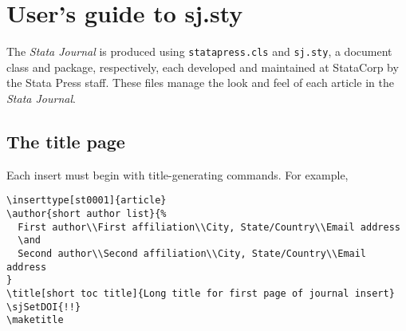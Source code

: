 
\section{User's guide to sj.sty}

The {\sl Stata Journal\/} is produced using \texttt{statapress.cls} and
\texttt{sj.sty}, a {\LaTeXe} document class and package, respectively, each
developed and maintained at StataCorp by the Stata Press staff.  These files
manage the look and feel of each article in the {\sl Stata Journal}.

\subsection{The title page}

Each insert must begin with title-generating commands.  For example,

\begin{stverbatim}
\begin{verbatim}
\inserttype[st0001]{article}
\author{short author list}{%
  First author\\First affiliation\\City, State/Country\\Email address
  \and
  Second author\\Second affiliation\\City, State/Country\\Email address
}
\title[short toc title]{Long title for first page of journal insert}
\sjSetDOI{!!}
\maketitle
\end{verbatim}
\end{stverbatim}

